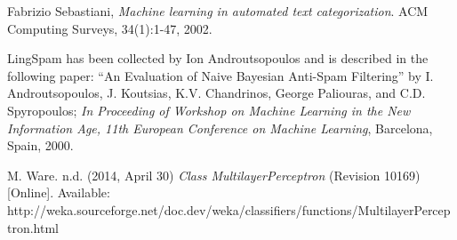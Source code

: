 \documentclass[10pt, a4paper]{article}
\begin{document}
\begin{thebibliography}{9}

  Fabrizio Sebastiani, \emph{Machine learning in automated text categorization}. ACM Computing Surveys, 34(1):1-47, 2002.

LingSpam has been collected by Ion Androutsopoulos and is described in the following paper: ``An Evaluation of Naive Bayesian Anti-Spam Filtering'' by I. Androutsopoulos, J. Koutsias, K.V. Chandrinos, George Paliouras, and C.D. Spyropoulos; \textit{In Proceeding of Workshop on Machine Learning in the New Information Age, 11th European Conference on Machine Learning}, Barcelona, Spain, 2000.

M. Ware. n.d. (2014, April 30) \emph{Class MultilayerPerceptron} (Revision 10169) [Online]. Available: http://weka.sourceforge.net/doc.dev/weka/classifiers/functions/MultilayerPerceptron.html

\end{thebibliography}
\end{document}
